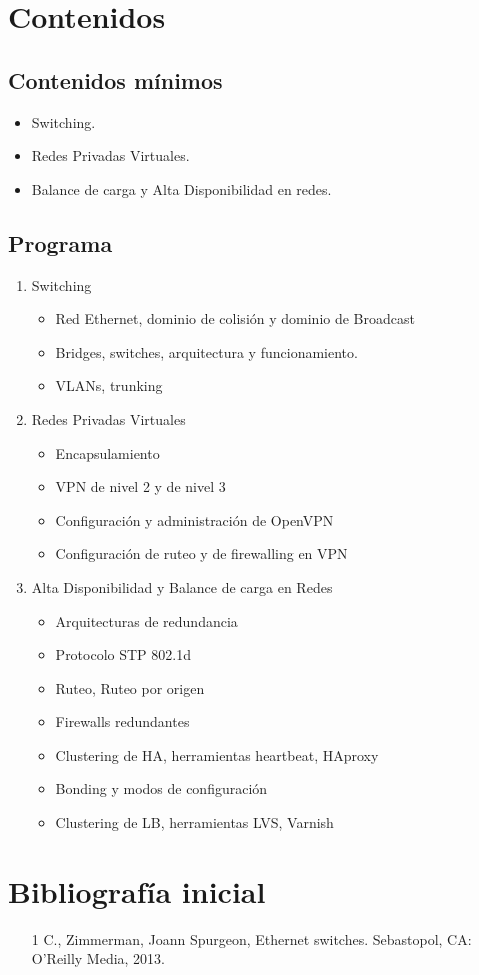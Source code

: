 \section {Contenidos}
\subsection{Contenidos mínimos}
\begin{itemize} 
	\item Switching. 
	\item Redes Privadas Virtuales. 
	\item Balance de carga y Alta Disponibilidad en redes. 
\end{itemize}


\subsection {Programa}
\begin{enumerate}
	\item Switching
		\begin{itemize}
			\item Red Ethernet, dominio de colisión y dominio de Broadcast
			\item Bridges, switches, arquitectura y funcionamiento. 
			\item VLANs, trunking
		\end{itemize}
	\item Redes Privadas Virtuales
		\begin{itemize}
			\item Encapsulamiento
			\item VPN de nivel 2 y de nivel 3
			\item Configuración y administración de OpenVPN
			\item Configuración de ruteo y de firewalling en VPN
		\end{itemize}
	\item Alta Disponibilidad y Balance de carga en Redes
		\begin{itemize}
			\item Arquitecturas de redundancia 
			\item Protocolo STP 802.1d
			\item Ruteo, Ruteo por origen 
			\item Firewalls redundantes
			\item Clustering de HA, herramientas heartbeat, HAproxy
			\item Bonding y modos de configuración
			\item Clustering de LB, herramientas LVS, Varnish 
		\end{itemize}

\end{enumerate}

\section {Bibliografía inicial}
\begin{itemize}
\item [1]C., Zimmerman, Joann Spurgeon, Ethernet switches. Sebastopol, CA: O’Reilly Media, 2013.

\end{itemize}



